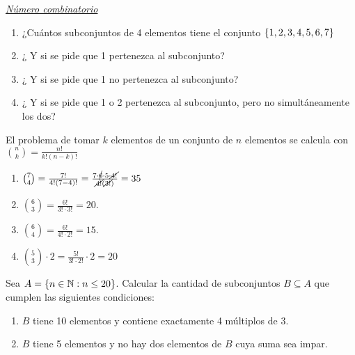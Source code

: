 \documentclass[12pt,a4paper, spanish]{article}
\begin{document}

\separador

{\it \underline{Número combinatorio}}

\ejercicio

\begin{enumerate}[label=\roman*)]
	\item ¿Cuántos subconjuntos de 4 elementos tiene el conjunto $\set{\foreach \i in {1,...,6}{ \i, }7} $
	\item ¿ Y si se pide que 1 pertenezca al subconjunto?
	\item ¿ Y si se pide que 1 no pertenezca al subconjunto?
	\item ¿ Y si se pide que 1 o 2 pertenezca al subconjunto, pero no simultáneamente los dos?
\end{enumerate}

\separadorCorto

El problema de tomar $k$ elementos de un conjunto de $n$ elementos se calcula con $\binom{n}{k} = \frac{n!}{k!(n-k)!}$

\begin{enumerate}[label=\roman*)]
	\item  $\binom{7}{4} = \frac{7!}{4!(7-4)!} = \frac{7\cdot \cancel{6} \cdot 5 \cdot \cancel{4!}}{\cancel{4!}(\cancel{3!})} = 35$

	\item $\binom{6}{3} = \frac{6!}{3!\cdot 3!} = 20$.

	\item $\binom{6}{4} = \frac{6!}{4!\cdot 2!} = 15$.

	\item $\binom{5}{3} \cdot 2 = \frac{5!}{3!\cdot 2!} \cdot 2 = 20$
\end{enumerate}

\ejercicio
Sea $A = \left\{ n \in \mathbb N : n \leq 20 \right\}$. Calcular la cantidad de subconjuntos $B \subseteq A$ que cumplen las siguientes condiciones:
\begin{enumerate}[label=\roman*)]
	\item $B$ tiene 10 elementos y contiene exactamente 4 múltiplos de 3.
	\item $B$ tiene 5 elementos y no hay dos elementos de $B$ cuya suma sea impar.
\end{enumerate}

\separadorCorto
\end{document}
